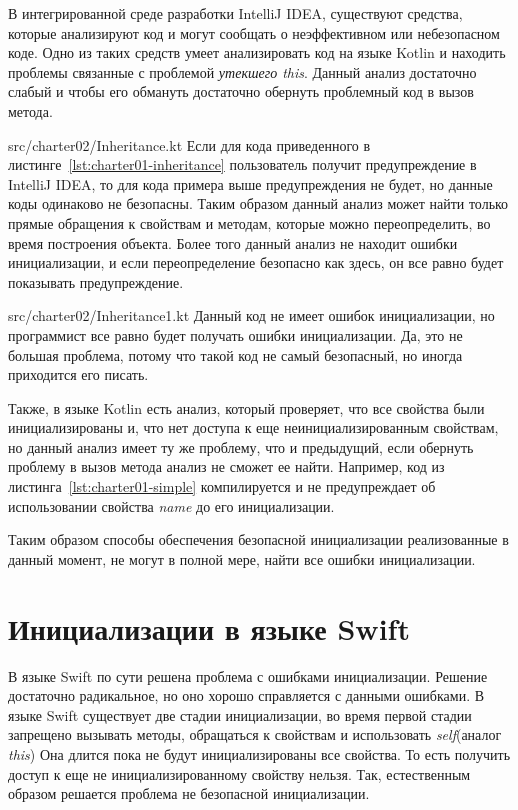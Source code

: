 В интегрированной среде разработки IntelliJ IDEA, существуют средства,
которые анализируют код и могут сообщать о неэффективном или небезопасном коде.
Одно из таких средств умеет анализировать код на языке Kotlin и находить проблемы связанные с проблемой \textit{утекшего this}.
Данный анализ достаточно слабый и чтобы его обмануть достаточно обернуть проблемный код в вызов метода.

{src/charter02/Inheritance.kt}
Если для кода приведенного в листинге~\ref{lst:charter01-inheritance} пользователь получит предупреждение в IntelliJ IDEA,
то для кода примера выше предупреждения не будет, но данные коды одинаково не безопасны.
Таким образом данный анализ может найти только прямые обращения к свойствам и методам, которые можно переопределить,
во время построения объекта.
Более того данный анализ не находит ошибки инициализации, и если переопределение безопасно как здесь,
он все равно будет показывать предупреждение.

{src/charter02/Inheritance1.kt}
Данный код не имеет ошибок инициализации, но программист все равно будет получать ошибки инициализации.
Да, это не большая проблема, потому что такой код не самый безопасный, но иногда приходится его писать.

Также, в языке Kotlin есть анализ, который проверяет, что все свойства были инициализированы и,
что нет доступа к еще неинициализированным свойствам, но данный анализ имеет ту же проблему, что и предыдущий,
если обернуть проблему в вызов метода анализ не сможет ее найти.
Например, код из листинга~\ref{lst:charter01-simple} компилируется и не предупреждает об использовании свойства \emph{name}
до его инициализации.

Таким образом способы обеспечения безопасной инициализации реализованные в данный момент, не могут в полной мере,
найти все ошибки инициализации.


\section{Инициализации в языке Swift}\label{sec:инициализации-в-языке-swift}

В языке Swift по сути решена проблема с ошибками инициализации.
Решение достаточно радикальное, но оно хорошо справляется с данными ошибками.
В языке Swift существует две стадии инициализации, во время первой стадии запрещено вызывать методы,
обращаться к свойствам и использовать \emph{self}(аналог \emph{this})
Она длится пока не будут инициализированы все свойства.
То есть получить доступ к еще не инициализированному свойству нельзя.
Так, естественным образом решается проблема не безопасной инициализации.

